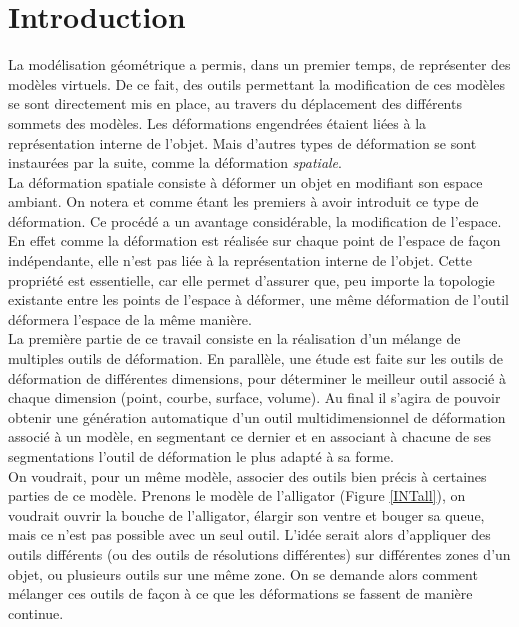 \chapter{Introduction}

\graphicspath{ {Introduction/IntroductionFigs/PNG/}
  {Introduction/IntroductionFigs/PDF/}
  {Introduction/IntroductionFigs/} }

La modélisation géométrique a permis, dans un premier temps, de
représenter des modèles virtuels. De ce fait, des outils permettant la
modification de ces modèles se sont directement mis en place, au
travers du déplacement des différents sommets des modèles. Les
déformations engendrées étaient liées à la représentation interne de
l'objet. Mais d'autres types de déformation se sont instaurées par la
suite, comme la déformation \textit{spatiale}.
\\

La déformation spatiale consiste à déformer un objet en modifiant son
espace ambiant.  On notera \cite{Bar84} et \cite{SP86} comme étant les
premiers à avoir introduit ce type de déformation. Ce procédé a un
avantage considérable, la modification de l'espace. En effet comme la
déformation est réalisée sur chaque point de l'espace de façon
indépendante, elle n'est pas liée à la représentation interne de
l'objet. Cette propriété est essentielle, car elle permet d'assurer
que, peu importe la topologie existante entre les points de l'espace à
déformer, une même déformation de l'outil déformera l'espace de la
même manière.
\\

La première partie de ce travail consiste en la réalisation d'un
mélange de multiples outils de déformation. En parallèle, une étude
est faite sur les outils de déformation de différentes dimensions,
pour déterminer le meilleur outil associé à chaque dimension (point,
courbe, surface, volume). Au final il s'agira de pouvoir obtenir une
génération automatique d'un outil multidimensionnel de déformation
associé à un modèle, en segmentant ce dernier et en associant à
chacune de ses segmentations l'outil de déformation le plus adapté à
sa forme.
\\

On voudrait, pour un même modèle, associer des outils bien précis à
certaines parties de ce modèle. Prenons le modèle de l'alligator
(Figure \ref{INTall}), on voudrait ouvrir la bouche de l'alligator,
élargir son ventre et bouger sa queue, mais ce n'est pas possible avec
un seul outil. L'idée serait alors d'appliquer des outils différents
(ou des outils de résolutions différentes) sur différentes zones d'un
objet, ou plusieurs outils sur une même zone. On se demande alors
comment mélanger ces outils de façon à ce que les déformations se
fassent de manière continue.
\\

